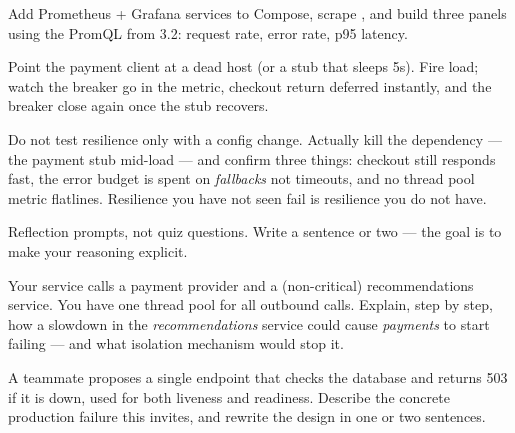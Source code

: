 Add Prometheus + Grafana services to Compose, scrape , and build three panels using the PromQL from 3.2: request rate, error rate, p95 latency.

Point the payment client at a dead host (or a stub that sleeps 5s). Fire load; watch the breaker go  in the  metric, checkout return deferred instantly, and the breaker close again once the stub recovers.

\begin{prodtip}
Do not test resilience only with a config change. Actually kill the dependency ---  the payment stub mid-load --- and confirm three things: checkout still responds fast, the error budget is spent on \emph{fallbacks} not timeouts, and no thread pool metric flatlines. Resilience you have not seen fail is resilience you do not have.
\end{prodtip}


Reflection prompts, not quiz questions. Write a sentence or two --- the goal is to make your reasoning explicit.

\begin{thinkbox}
Your service calls a payment provider and a (non-critical) recommendations service. You have one thread pool for all outbound calls. Explain, step by step, how a slowdown in the \emph{recommendations} service could cause \emph{payments} to start failing --- and what isolation mechanism would stop it.
\end{thinkbox}

\begin{thinkbox}
A teammate proposes a single  endpoint that checks the database and returns 503 if it is down, used for both liveness and readiness. Describe the concrete production failure this invites, and rewrite the design in one or two sentences.
\end{thinkbox}

